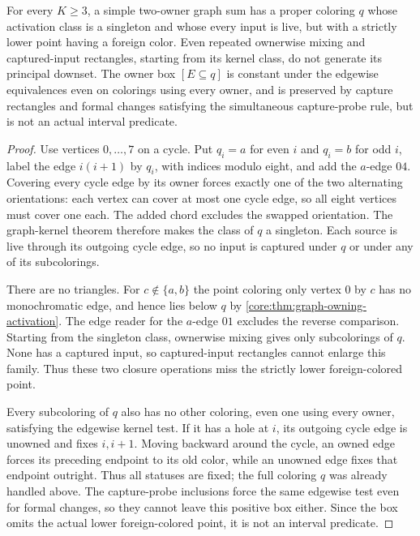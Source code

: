 \begin{proposition}
\label{core:prop:frozen-owning-target}
For every $K\geq3$, a simple two-owner graph sum has a proper
coloring $q$ whose activation class is a singleton and whose every
input is live, but with a strictly lower point having a foreign color.
Even repeated ownerwise mixing and captured-input rectangles,
starting from its kernel class, do not generate its principal downset.
The owner box $[E\subseteq q]$ is constant under the edgewise
equivalences even on colorings using every owner, and is preserved
by capture rectangles and formal
changes satisfying the simultaneous capture-probe rule, but is not
an actual interval predicate.
\end{proposition}
\begin{proof}
Use vertices $0,\ldots,7$ on a cycle. Put $q_i=a$ for even $i$
and $q_i=b$ for odd $i$, label the edge $i(i+1)$ by $q_i$,
with indices modulo eight, and add the $a$-edge $04$.
Covering every cycle edge by its owner forces exactly one of the
two alternating orientations: each vertex can cover at most one
cycle edge, so all eight vertices must cover one each.
The added chord excludes the swapped orientation. The graph-kernel
theorem therefore makes the class of $q$ a singleton.
Each source is live through its outgoing cycle edge, so no input
is captured under $q$ or under any of its subcolorings.

There are no triangles. For $c\notin\{a,b\}$ the point coloring
only vertex $0$ by $c$ has no monochromatic edge, and hence lies
below $q$ by \cref{core:thm:graph-owning-activation}.
The edge reader for the $a$-edge $01$ excludes the reverse comparison.
Starting from the singleton class, ownerwise mixing gives only
subcolorings of $q$. None has a captured input, so captured-input
rectangles cannot enlarge this family. Thus these two closure
operations miss the strictly lower foreign-colored point.

Every subcoloring of $q$ also has no other coloring, even one using
every owner, satisfying the edgewise kernel test.
If it has a hole at $i$, its outgoing cycle edge is unowned and
fixes $i,i+1$. Moving backward around the cycle, an owned edge
forces its preceding endpoint to its old color, while an unowned
edge fixes that endpoint outright. Thus all statuses are fixed;
the full coloring $q$ was already handled above.
The capture-probe inclusions force the same edgewise test even
for formal changes, so they cannot leave this positive box either.
Since the box omits the actual lower foreign-colored point, it is
not an interval predicate.
\end{proof}
